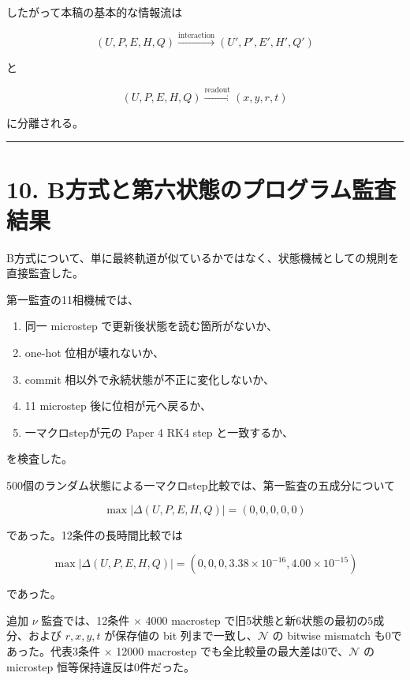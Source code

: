 \documentclass[
  a4paper,
]{ltjsarticle}
\providecommand{\tightlist}{%
  \setlength{\itemsep}{0pt}\setlength{\parskip}{0pt}}
\begin{document}
したがって本稿の基本的な情報流は

\[
\boxed{
(U,P,E,H,Q)
\xrightarrow{\text{interaction}}
(U',P',E',H',Q')
}
\]

と

\[
\boxed{
(U,P,E,H,Q)
\xrightarrow{\text{readout}}
(x,y,r,t)
}
\]

に分離される。

\begin{center}\rule{0.5\linewidth}{0.5pt}\end{center}

\section{10.
B方式と第六状態のプログラム監査結果}\label{bux65b9ux5f0fux3068ux7b2cux516dux72b6ux614bux306eux30d7ux30edux30b0ux30e9ux30e0ux76e3ux67fbux7d50ux679c}

B方式について、単に最終軌道が似ているかではなく、状態機械としての規則を直接監査した。

第一監査の11相機械では、

\begin{enumerate}
\def\labelenumi{\arabic{enumi}.}
\tightlist
\item
  同一 microstep で更新後状態を読む箇所がないか、
\item
  one-hot 位相が壊れないか、
\item
  commit 相以外で永続状態が不正に変化しないか、
\item
  11 microstep 後に位相が元へ戻るか、
\item
  一マクロstepが元の Paper 4 RK4 step と一致するか、
\end{enumerate}

を検査した。

500個のランダム状態による一マクロstep比較では、第一監査の五成分について

\[
\boxed{
\max|\Delta(U,P,E,H,Q)|=(0,0,0,0,0)
}
\]

であった。12条件の長時間比較では

\[
\boxed{
\max|\Delta(U,P,E,H,Q)|
=
(0,0,0,3.38\times10^{-16},4.00\times10^{-15})
}
\]

であった。

追加 \(\nu\) 監査では、12条件 \(\times\) 4000 macrostep
で旧5状態と新6状態の最初の5成分、および \(r,x,y,t\) が保存値の bit
列まで一致し、\(\mathcal N\) の bitwise mismatch も0であった。代表3条件
\(\times\) 12000 macrostep でも全比較量の最大差は0で、\(\mathcal N\) の
microstep 恒等保持違反は0件だった。
\end{document}
